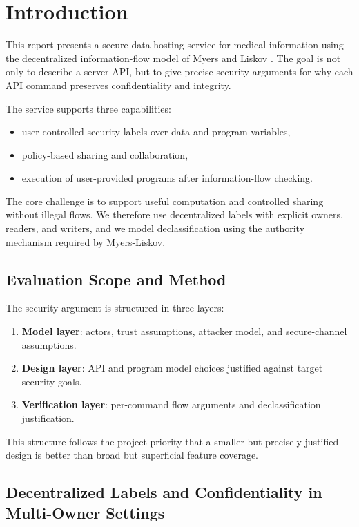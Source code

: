 \section{Introduction}

This report presents a secure data-hosting service for medical information using the decentralized information-flow model of Myers and Liskov \cite{MyersLiskov97}. The goal is not only to describe a server API, but to give precise security arguments for why each API command preserves confidentiality and integrity.

The service supports three capabilities:
\begin{itemize}
    \item user-controlled security labels over data and program variables,
    \item policy-based sharing and collaboration,
    \item execution of user-provided programs after information-flow checking.
\end{itemize}

The core challenge is to support useful computation and controlled sharing without illegal flows. We therefore use decentralized labels with explicit owners, readers, and writers, and we model declassification using the authority mechanism required by Myers-Liskov.

\subsection{Evaluation Scope and Method}

The security argument is structured in three layers:
\begin{enumerate}
    \item \textbf{Model layer}: actors, trust assumptions, attacker model, and secure-channel assumptions.
    \item \textbf{Design layer}: API and program model choices justified against target security goals.
    \item \textbf{Verification layer}: per-command flow arguments and declassification justification.
\end{enumerate}

This structure follows the project priority that a smaller but precisely justified design is better than broad but superficial feature coverage.

\subsection{Decentralized Labels and Confidentiality in Multi-Owner Settings}

